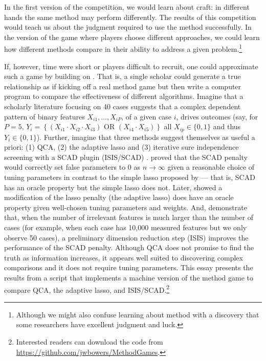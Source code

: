 \documentclass[12pt]{article}
\begin{document}
In the first version of the competition, we would learn about craft: in
different hands the same method may perform differently. The results of this
competition would teach us about the judgment required to use the method
successfully.  In the version of the game where players choose different
approaches, we could learn how different methods compare in their ability to
address a given problem.\footnote{Although we might also confuse learning
  about method with a discovery that some researchers have excellent judgment
  and luck.}

If, however, time were short or players difficult to recruit, one could
approximate such a game by building on \cite{lucasfk2014}. That is, a single
scholar could generate a true relationship as if kicking off a real method
game but then write a computer program to compare the effectiveness of
different algorithms. Imagine that a scholarly literature focusing on 40 cases
suggests that a complex dependent pattern of binary features $X_{i1}, \ldots,
X_{iP}$, of a given case $i$, drives outcomes (say, for $P=5$, $Y_i= \left\{
  (X_{i1} \cdot X_{i2} \cdot X_{i3} ) \text{ OR } ( X_{i4} \cdot X_{i5})
\right\}$ all $X_{ip}  \in \{0,1\}$ and thus $Y_i \in \{0,1\}$).  Further,
imagine that three methods suggest themselves as useful a priori: (1) QCA, (2)
the adaptive lasso and (3) iterative sure independence screening with a SCAD
plugin (ISIS/SCAD) \citep{fan2008sure}.  \citet{fan2001variable} proved that
the SCAD penalty would correctly set false parameters to 0 as $n \rightarrow
\infty$ given a reasonable choice of tuning parameters in contrast to the
simple lasso proposed by \cite{tibshirani1996regression} --- that is, SCAD has
an oracle property but the simple lasso does not. Later,
\citet{zou2006adaptive} showed a modification of the lasso penalty (the
adaptive lasso) does have an oracle property given well-chosen tuning
parameters and weights.  And, \citet{fan2008sure} demonstrate that, when the
number of irrelevant features is much larger than the number of cases (for
example, when each case has 10,000 measured features but we only observe 50
cases), a preliminary dimension reduction step (ISIS) improves the performance
of the SCAD penalty.  Although QCA does not promise to find the truth as
information increases, it appears well suited to discovering complex
comparisons and it does not require tuning parameters. This essay presents the
results from a script that implements a machine version of the method game to
compare QCA, the adaptive lasso, and ISIS/SCAD.\footnote{Interested readers
  can download the code from \url{https://github.com/jwbowers/MethodGames}.}
\end{document}
